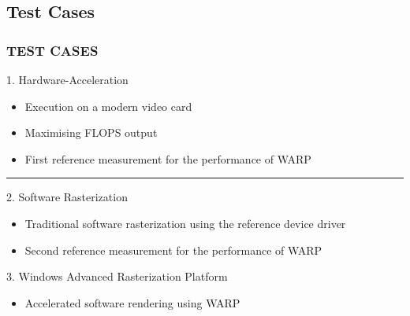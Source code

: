 \subsection{Test Cases}
\begin{frame}
\frametitle{TEST CASES}

\begin{block}{1. Hardware-Acceleration}
  \begin{itemize}
  \item Execution on a modern video card
  \item Maximising FLOPS output
  \item First reference measurement for the performance of WARP
  \end{itemize}
\end{block}
\noindent\rule{11cm}{0.4pt}
\begin{block}{2. Software Rasterization}
  \begin{itemize}
  \item Traditional software rasterization using the reference device driver
  \item Second reference measurement for the performance of WARP
  \end{itemize}
\end{block}
\begin{block}{3. Windows Advanced Rasterization Platform}
  \begin{itemize}
  \item Accelerated software rendering using WARP
  \end{itemize}
\end{block}

\end{frame}

